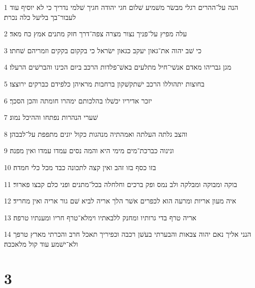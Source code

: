 \par 1 הנה על־ההרים רגלי מבשׂר משׁמיע שׁלום חגי יהודה חגיך שׁלמי נדריך כי לא יוסיף עוד לעבור־בך בליעל כלה נכרת׃
\par 2 עלה מפיץ על־פניך נצור מצרה צפה־דרך חזק מתנים אמץ כח מאד׃
\par 3 כי שׁב יהוה את־גאון יעקב כגאון ישׂראל כי בקקום בקקים וזמריהם שׁחתו׃
\par 4 מגן גבריהו מאדם אנשׁי־חיל מתלעים באשׁ־פלדות הרכב ביום הכינו והברשׁים הרעלו׃
\par 5 בחוצות יתהוללו הרכב ישׁתקשׁקון ברחבות מראיהן כלפידם כברקים ירוצצו׃
\par 6 יזכר אדיריו יכשׁלו בהלכותם ימהרו חומתה והכן הסכך׃
\par 7 שׁערי הנהרות נפתחו וההיכל נמוג׃
\par 8 והצב גלתה העלתה ואמהתיה מנהגות כקול יונים מתפפת על־לבבהן׃
\par 9 ונינוה כברכת־מים מימי היא והמה נסים עמדו עמדו ואין מפנה׃
\par 10 בזו כסף בזו זהב ואין קצה לתכונה כבד מכל כלי חמדה׃
\par 11 בוקה ומבוקה ומבלקה ולב נמס ופק ברכים וחלחלה בכל־מתנים ופני כלם קבצו פארור׃
\par 12 איה מעון אריות ומרעה הוא לכפרים אשׁר הלך אריה לביא שׁם גור אריה ואין מחריד׃
\par 13 אריה טרף בדי גרותיו ומחנק ללבאתיו וימלא־טרף חריו ומענתיו טרפה׃
\par 14 הנני אליך נאם יהוה צבאות והבערתי בעשׁן רכבה וכפיריך תאכל חרב והכרתי מארץ טרפך ולא־ישׁמע עוד קול מלאככה׃

\chapter{3}


